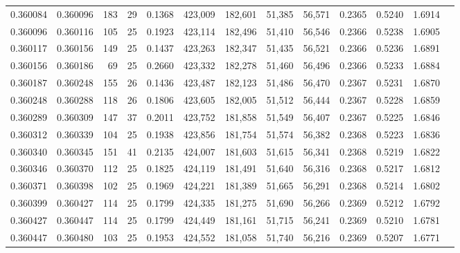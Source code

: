 \begin{tabular}{rrrrrrrrrrrrr}
0.360084 & 0.360096 &   183 &  29 &                                     0.1368 & 423,009 & 182,601 &  51,385 &  56,571 & 0.2365 & 0.5240 & 1.6914 \\
0.360096 & 0.360116 &   105 &  25 &                                     0.1923 & 423,114 & 182,496 &  51,410 &  56,546 & 0.2366 & 0.5238 & 1.6905 \\
0.360117 & 0.360156 &   149 &  25 &                                     0.1437 & 423,263 & 182,347 &  51,435 &  56,521 & 0.2366 & 0.5236 & 1.6891 \\
0.360156 & 0.360186 &    69 &  25 &                                     0.2660 & 423,332 & 182,278 &  51,460 &  56,496 & 0.2366 & 0.5233 & 1.6884 \\
0.360187 & 0.360248 &   155 &  26 &                                     0.1436 & 423,487 & 182,123 &  51,486 &  56,470 & 0.2367 & 0.5231 & 1.6870 \\
0.360248 & 0.360288 &   118 &  26 &                                     0.1806 & 423,605 & 182,005 &  51,512 &  56,444 & 0.2367 & 0.5228 & 1.6859 \\
0.360289 & 0.360309 &   147 &  37 &                                     0.2011 & 423,752 & 181,858 &  51,549 &  56,407 & 0.2367 & 0.5225 & 1.6846 \\
0.360312 & 0.360339 &   104 &  25 &                                     0.1938 & 423,856 & 181,754 &  51,574 &  56,382 & 0.2368 & 0.5223 & 1.6836 \\
0.360340 & 0.360345 &   151 &  41 &                                     0.2135 & 424,007 & 181,603 &  51,615 &  56,341 & 0.2368 & 0.5219 & 1.6822 \\
0.360346 & 0.360370 &   112 &  25 &                                     0.1825 & 424,119 & 181,491 &  51,640 &  56,316 & 0.2368 & 0.5217 & 1.6812 \\
0.360371 & 0.360398 &   102 &  25 &                                     0.1969 & 424,221 & 181,389 &  51,665 &  56,291 & 0.2368 & 0.5214 & 1.6802 \\
0.360399 & 0.360427 &   114 &  25 &                                     0.1799 & 424,335 & 181,275 &  51,690 &  56,266 & 0.2369 & 0.5212 & 1.6792 \\
0.360427 & 0.360447 &   114 &  25 &                                     0.1799 & 424,449 & 181,161 &  51,715 &  56,241 & 0.2369 & 0.5210 & 1.6781 \\
0.360447 & 0.360480 &   103 &  25 &                                     0.1953 & 424,552 & 181,058 &  51,740 &  56,216 & 0.2369 & 0.5207 & 1.6771 \\

\end{tabular}
